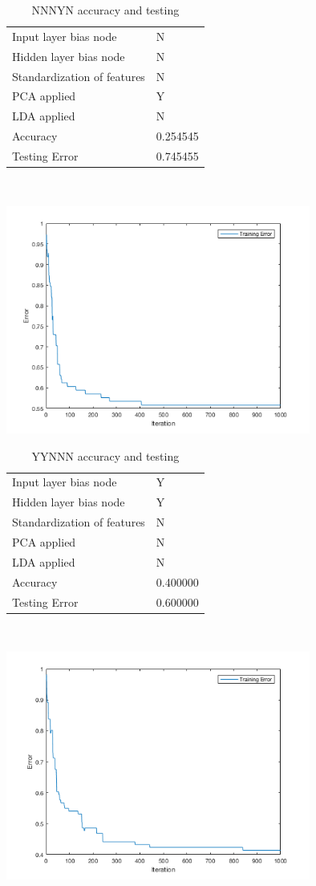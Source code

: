 \documentclass[12pt]{article}
\newcommand{\accuracyAndTestErrorTable}[8]{
  \begin{tabular}{l|l}
    \hline
    Input layer bias node & #1 \\
    Hidden layer bias node & #2 \\
    Standardization of features & #3 \\
    PCA applied & #4 \\
    LDA applied & #5 \\
    \hline
    Accuracy & #6 \\
    Testing Error & #7 \\
    \hline
  \end{tabular}
  ~\\[60pt]
  \caption{#8}
}
\begin{document}
\begin{center}
  \begin{table}[H]
    \begin{varwidth}[b]{0.4\linewidth}
      \centering
      \accuracyAndTestErrorTable{N}{N}{N}{Y}{N}{0.254545}{0.745455}{NNNYN accuracy and testing}
      \label{table:NNNYN}
    \end{varwidth}%
    \hfill
    \begin{minipage}[b]{0.6\linewidth}
      \centering
      \includegraphics[width=100mm]{NNNYN_training_error.png}
      \label{fig:NNNYN}
    \end{minipage}
  \end{table}
\end{center}






\begin{center}
  \begin{table}[H]
    \begin{varwidth}[b]{0.4\linewidth}
      \centering
      \accuracyAndTestErrorTable{Y}{Y}{N}{N}{N}{0.400000}{0.600000}{YYNNN accuracy and testing}
      \label{table:YYNNN}
    \end{varwidth}%
    \hfill
    \begin{minipage}[b]{0.6\linewidth}
      \centering
      \includegraphics[width=100mm]{YYNNN_training_error.png}
      \label{fig:YYNNN}
    \end{minipage}
  \end{table}
\end{center}
\end{document}
